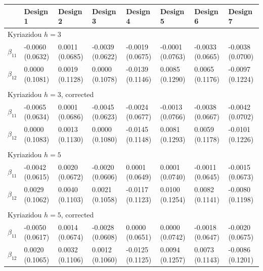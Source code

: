 \begin{table}
    \begin{adjustwidth}{-.5in}{-.5in}
    \small
    \centering
    \begin{tabular}{p{3cm}p{1.3cm}p{1.3cm}p{1.3cm}p{1.3cm}p{1.3cm}p{1.3cm}p{1.3cm}}
      \hline
       \quad & Design 1 & Design 2 & Design 3 & Design 4 & Design 5 & Design 6 & Design 7  \\
       \hline
        \multicolumn{8}{l}{Kyriazidou $h=3$} \\
       \hline
        $\beta_{11}$  & -0.0060 (0.0632) & 0.0011 (0.0685) & -0.0039 (0.0622) & -0.0019 (0.0675) & -0.0001 (0.0763) &  -0.0033 (0.0665) & -0.0038 (0.0700) \\
        $\beta_{12}$  & 0.0000 (0.1081) & 0.0019 (0.1128) & 0.0000 (0.1078) & -0.0139 (0.1146) & 0.0085 (0.1290) & 0.0065 (0.1176) & -0.0097 (0.1224) \\
        & & & & & & & \\
        \hline
        \multicolumn{8}{l}{Kyriazidou $h=3$, corrected} \\
       \hline
        $\beta_{11}$  & -0.0065 (0.0634) & 0.0001 (0.0686) & -0.0045 (0.0623) & -0.0024 (0.0677) & -0.0013 (0.0766) & -0.0038 (0.0667) & -0.0042 (0.0702)\\
        $\beta_{12}$  & 0.0000 (0.1083) & 0.0013 (0.1130) & 0.0000 (0.1080) & -0.0145 (0.1148) & 0.0081 (0.1293) &  0.0059 (0.1178) & -0.0101 (0.1226)\\
                 & & & & & & & \\
        \hline
        \multicolumn{8}{l}{Kyriazidou $h=5$} \\
       \hline
        $\beta_{11}$  & -0.0042 (0.0615) & 0.0020 (0.0672) & -0.0020 (0.0606) & 0.0001 (0.0649) & 0.0001 (0.0740) &  -0.0011 (0.0645) & -0.0015 (0.0673)\\
        $\beta_{12}$  & 0.0029 (0.1062) & 0.0040 (0.1103) & 0.0021 (0.1058) & -0.0117 (0.1123) & 0.0100 (0.1254) &  0.0082 (0.1141) & -0.0080 (0.1198) \\
        & & & & & & & \\
        \hline
        \multicolumn{8}{l}{Kyriazidou $h=5$, corrected} \\
       \hline
        $\beta_{11}$  & -0.0050 (0.0617) & 0.0014 (0.0674) & -0.0028 (0.0608) & 0.0000 (0.0651) & 0.0000 (0.0742) &  -0.0018 (0.0647) & -0.0020 (0.0675)\\
        $\beta_{12}$  & 0.0020 (0.1065) & 0.0032 (0.1106) & 0.0012 (0.1060) & -0.0125 (0.1125) & 0.0094 (0.1257) &  0.0073 (0.1143) & -0.0086 (0.1201) \\

\end{tabular}
\end{adjustwidth}
\end{table}
